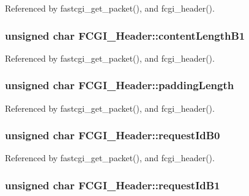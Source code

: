 Referenced by fastcgi\-\_\-get\-\_\-packet(), and fcgi\-\_\-header().

\hypertarget{structFCGI__Header_a4062d9e45a31f00b0c4a723b105eeac2}{
\subsubsection[{content\-Length\-B1}]{\setlength{\rightskip}{0pt plus 5cm}unsigned char F\-C\-G\-I\-\_\-\-Header\-::content\-Length\-B1}}\label{structFCGI__Header_a4062d9e45a31f00b0c4a723b105eeac2}


Referenced by fastcgi\-\_\-get\-\_\-packet(), and fcgi\-\_\-header().

\hypertarget{structFCGI__Header_a00c2e5dc1e01e49266d5d8229da6217e}{
\subsubsection[{padding\-Length}]{\setlength{\rightskip}{0pt plus 5cm}unsigned char F\-C\-G\-I\-\_\-\-Header\-::padding\-Length}}\label{structFCGI__Header_a00c2e5dc1e01e49266d5d8229da6217e}


Referenced by fastcgi\-\_\-get\-\_\-packet(), and fcgi\-\_\-header().

\hypertarget{structFCGI__Header_adc8534fcead13ed5b30d73463ae72cef}{
\subsubsection[{request\-Id\-B0}]{\setlength{\rightskip}{0pt plus 5cm}unsigned char F\-C\-G\-I\-\_\-\-Header\-::request\-Id\-B0}}\label{structFCGI__Header_adc8534fcead13ed5b30d73463ae72cef}


Referenced by fastcgi\-\_\-get\-\_\-packet(), and fcgi\-\_\-header().

\hypertarget{structFCGI__Header_aaaffa134f46b2fef7b3869811cbce96d}{
\subsubsection[{request\-Id\-B1}]{\setlength{\rightskip}{0pt plus 5cm}unsigned char F\-C\-G\-I\-\_\-\-Header\-::request\-Id\-B1}}\label{structFCGI__Header_aaaffa134f46b2fef7b3869811cbce96d}


